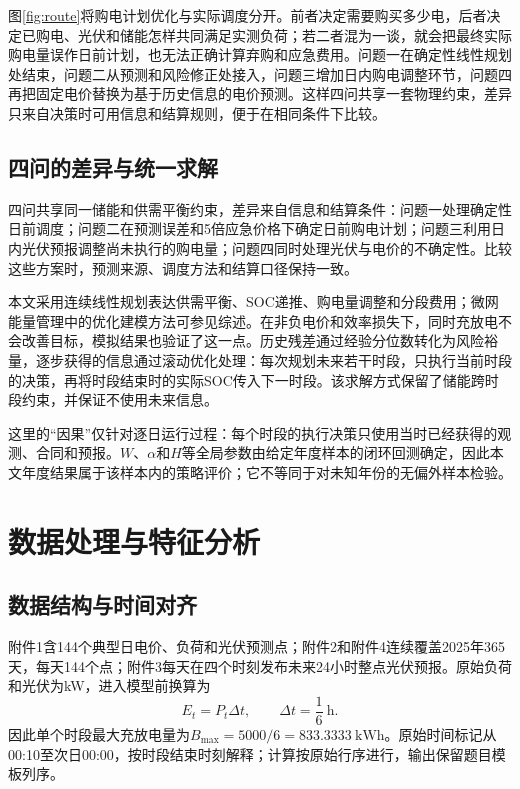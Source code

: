 \documentclass[UTF8,12pt,a4paper]{ctexart}
\theoremstyle{remark}
\begin{document}
图\ref{fig:route}将购电计划优化与实际调度分开。前者决定需要购买多少电，后者决定已购电、光伏和储能怎样共同满足实测负荷；若二者混为一谈，就会把最终实际购电量误作日前计划，也无法正确计算弃购和应急费用。问题一在确定性线性规划处结束，问题二从预测和风险修正处接入，问题三增加日内购电调整环节，问题四再把固定电价替换为基于历史信息的电价预测。这样四问共享一套物理约束，差异只来自决策时可用信息和结算规则，便于在相同条件下比较。

\subsection{四问的差异与统一求解}
四问共享同一储能和供需平衡约束，差异来自信息和结算条件：问题一处理确定性日前调度；问题二在预测误差和5倍应急价格下确定日前购电计划；问题三利用日内光伏预报调整尚未执行的购电量；问题四同时处理光伏与电价的不确定性。比较这些方案时，预测来源、调度方法和结算口径保持一致。

本文采用连续线性规划表达供需平衡、SOC递推、购电量调整和分段费用；微网能量管理中的优化建模方法可参见综述\cite{nemati2018unitcommitment,thirunavukkarasu2022optimization}。在非负电价和效率损失下，同时充放电不会改善目标，模拟结果也验证了这一点。历史残差通过经验分位数转化为风险裕量，逐步获得的信息通过滚动优化处理：每次规划未来若干时段，只执行当前时段的决策，再将时段结束时的实际SOC传入下一时段。该求解方式保留了储能跨时段约束，并保证不使用未来信息。

这里的“因果”仅针对逐日运行过程：每个时段的执行决策只使用当时已经获得的观测、合同和预报。$W$、$\alpha$和$H$等全局参数由给定年度样本的闭环回测确定，因此本文年度结果属于该样本内的策略评价；它不等同于对未知年份的无偏外样本检验。

\section{数据处理与特征分析}
\subsection{数据结构与时间对齐}
附件1含144个典型日电价、负荷和光伏预测点；附件2和附件4连续覆盖2025年365天，每天144个点；附件3每天在四个时刻发布未来24小时整点光伏预报。原始负荷和光伏为kW，进入模型前换算为
\begin{equation}E_t=P_t\Delta t,\qquad \Delta t=\frac{1}{6}\ \mathrm{h}.\label{eq:power-energy}\end{equation}
因此单个时段最大充放电量为$B_{\max}=5000/6=833.3333\ \mathrm{kWh}$。原始时间标记从00:10至次日00:00，按时段结束时刻解释；计算按原始行序进行，输出保留题目模板列序。
\end{document}
